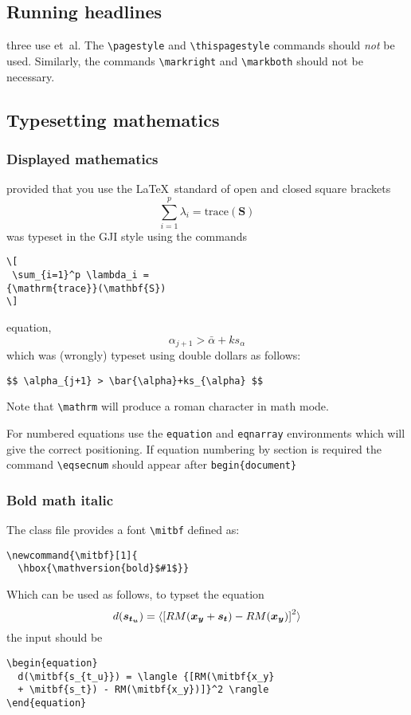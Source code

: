 \subsection{Running headlines}

three use et~al. The \verb"\pagestyle" and \verb"\thispagestyle"
commands should {\em not\/} be used. Similarly, the commands
\verb"\markright" and \verb"\markboth" should not be necessary.

\subsection{Typesetting mathematics}

\subsubsection{Displayed mathematics}

provided that you use the \LaTeX\ standard of open and closed square brackets
\[
 \sum_{i=1}^p \lambda_i =
{\mathrm{trace}}(\mathbf{S})
\]
was typeset in the GJI style using the commands
\begin{verbatim}
\[
 \sum_{i=1}^p \lambda_i =
{\mathrm{trace}}(\mathbf{S})
\]
\end{verbatim}
equation, \[ \alpha_{j+1} > \bar{\alpha}+ks_{\alpha} \]
which was (wrongly) typeset using double dollars as follows:
\begin{verbatim}
$$ \alpha_{j+1} > \bar{\alpha}+ks_{\alpha} $$
\end{verbatim}
Note that \verb"\mathrm" will produce a roman character in math mode.

For numbered equations use the \verb"equation" and \verb"eqnarray" environments
which will give the correct positioning. If equation numbering by section is
required the command \verb"\eqsecnum" should appear after \verb"begin{document}"

\subsubsection{Bold math italic}\label{boldmathitalic}

The class file provides a font \verb"\mitbf" defined as:
\begin{verbatim}
\newcommand{\mitbf}[1]{
  \hbox{\mathversion{bold}$#1$}}
\end{verbatim}
Which can be used as follows, to typset the equation
\begin{equation}
  d(\mitbf{s_{t_u}}) = \langle {[RM(\mitbf{x_y} + \mitbf{s_t}) - RM(\mitbf{x_y})]}^2 \rangle
\end{equation}
the input should be
\begin{verbatim}
\begin{equation}
  d(\mitbf{s_{t_u}}) = \langle {[RM(\mitbf{x_y}
  + \mitbf{s_t}) - RM(\mitbf{x_y})]}^2 \rangle
\end{equation}
\end{verbatim}

